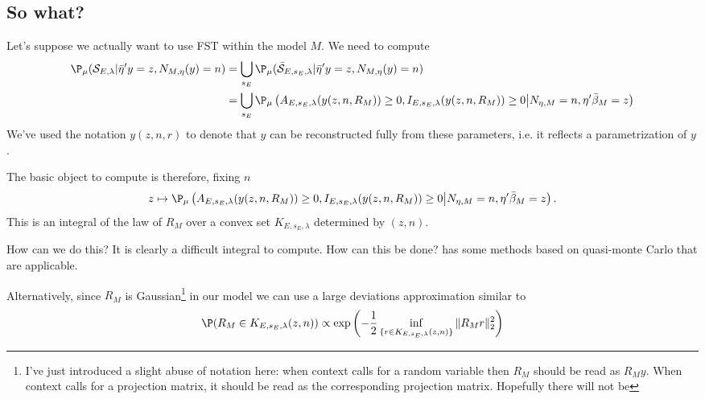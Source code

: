 \documentclass{article}
\newcommand{\OLS}{\bar{\beta}}
\begin{document}
        \subsection{So what?}

        Let's suppose we actually want to use FST within the model
        $M$.  We need to compute
        \begin{equation}
          \label{eq:selective:probability}
          \begin{aligned}
            \P_{\mu}({\cal S}_{E,\lambda} | \bar{\eta}'y=z, N_{M,\eta}(y)=n) &=
            \bigcup_{s_E} \P_{\mu}(\bar{\cal S}_{E,s_E,\lambda} | \bar{\eta}'y=z,
            N_{M,\eta}(y)=n) \\ &= \bigcup_{s_E} \P_{\mu}\left( A_{E,s_E,\lambda}(y(z,n,R_M)) \geq 0,
            I_{E,s_E,\lambda}(y(z,n,R_M)) \geq 0  \bigl | N_{\eta,M}=n, \eta'\OLS_M=z
            \right)
          \end{aligned}
          \end{equation}
        We've used the notation $y(z,n,r)$ to denote that $y$ can be
        reconstructed fully from these parameters, i.e. it reflects a
        parametrization of $y$.
        
        The basic object to compute is therefore, fixing $n$
        $$ z \mapsto \P_{\mu}\left( A_{E,s_E,\lambda}(y(z,n,R_M)) \geq 0, I_{E,s_E,\lambda}(y(z,n,R_M))
        \geq 0  \bigl | N_{\eta,M}=n, \eta'\OLS_M=z \right).
        $$ This is an integral of the law of $R_M$ over a convex set
        $K_{E,s_E,\lambda}$ determined by $(z,n)$.

        How can we do this? It is clearly a difficult integral to
        compute. How can this be done? \cite{sifan} has some methods
        based on quasi-monte Carlo that are applicable.

        Alternatively, since $R_M$ is Gaussian\footnote{I've just
        introduced a slight abuse of notation here: when context calls
        for a random variable then $R_M$ should be read as
        $R_My$. When context calls for a projection matrix, it should
        be read as the corresponding projection matrix. Hopefully
        there will not be } in our model we can use a large deviations
        approximation similar to \cite{snigdha...}
        \begin{equation}
          \label{eq:LD}
        \P(R_M \in K_{E,s_E,\lambda}(z,n)) \propto \exp\left(-\frac{1}{2}
        \inf_{\{r \in K_{E,s_E,\lambda}(z,n)\}} \|R_Mr\|^2_2\right)
        \end{equation}
\end{document}
